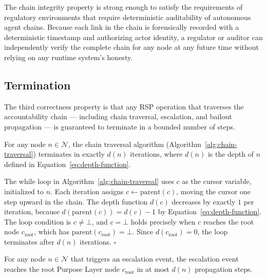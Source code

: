 The chain integrity property is strong enough to satisfy the requirements of regulatory environments that require deterministic auditability of autonomous agent chains. Because each link in the chain is forensically recorded with a deterministic timestamp and authorizing actor identity, a regulator or auditor can independently verify the complete chain for any node at any future time without relying on any runtime system's honesty.


\subsection{Termination}
\label{sec:termination}

The third correctness property is that any RSP operation that traverses the accountability chain — including chain traversal, escalation, and bailout propagation — is guaranteed to terminate in a bounded number of steps.

\begin{thrm}
\label{thrm:chain-termination}
For any node $n \in \mathcal{N}$, the chain traversal algorithm (Algorithm~\ref{alg:chain-traversal}) terminates in exactly $d(n)$ iterations, where $d(n)$ is the depth of $n$ defined in Equation~\ref{eq:depth-function}.
\end{thrm}

\begin{Proof}
The while loop in Algorithm~\ref{alg:chain-traversal} uses $c$ as the cursor variable, initialized to $n$. Each iteration assigns $c \gets \text{parent}(c)$, moving the cursor one step upward in the chain. The depth function $d(c)$ decreases by exactly $1$ per iteration, because $d(\text{parent}(c)) = d(c) - 1$ by Equation~\ref{eq:depth-function}. The loop condition is $c \neq \bot$, and $c = \bot$ holds precisely when $c$ reaches the root node $c_{\text{root}}$, which has $\text{parent}(c_{\text{root}}) = \bot$. Since $d(c_{\text{root}}) = 0$, the loop terminates after $d(n)$ iterations. $\square$
\end{Proof}

\begin{thrm}
\label{thrm:escalation-termination}
For any node $n \in \mathcal{N}$ that triggers an escalation event, the escalation event reaches the root Purpose Layer node $c_{\text{root}}$ in at most $d(n)$ propagation steps.
\end{thrm}

